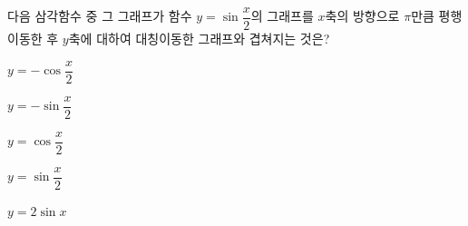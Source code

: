 다음 삼각함수 중 그 그래프가 함수 $y=\sin\dfrac{x}{2}$의 그래프를 $x$축의 방향으로 $\pi$만큼 평행이동한 후 $y$축에 대하여 대칭이동한 그래프와 겹쳐지는 것은?
\begin{choicesii}{\rule[-3ex]{0pt}{8ex}$y=-\cos\dfrac{x}{2}$}{\rule[-3ex]{0pt}{8ex}$y=-\sin\dfrac{x}{2}$}{\rule[-3ex]{0pt}{8ex}$y=\cos\dfrac{x}{2}$}{\rule[-3ex]{0pt}{8ex}$y=\sin\dfrac{x}{2}$}{\rule[-3ex]{0pt}{8ex}$y=2\sin x$}\end{choicesii}
